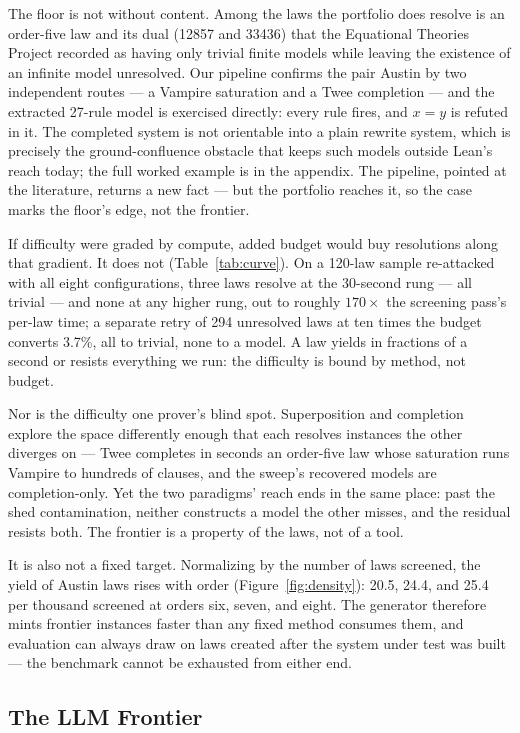 The floor is not without content. Among the laws the portfolio does resolve
is an order-five law and its dual (12857 and 33436) that the Equational
Theories Project recorded as having only trivial finite models while leaving
the existence of an infinite model unresolved. Our pipeline confirms the pair
Austin by two independent routes — a Vampire saturation and a Twee completion
— and the extracted 27-rule model is exercised directly: every rule fires,
and $x = y$ is refuted in it. The completed system is not orientable into a
plain rewrite system, which is precisely the ground-confluence obstacle that
keeps such models outside Lean's reach today; the full worked example is in
the appendix. The pipeline, pointed at the literature, returns a new fact —
but the portfolio reaches it, so the case marks the floor's edge, not the
frontier.

If difficulty were graded by compute, added budget would buy resolutions
along that gradient. It does not (Table~\ref{tab:curve}). On a 120-law
sample re-attacked with all eight configurations, three laws resolve at the
30-second rung — all trivial — and none at any higher rung, out to roughly
$170\times$ the screening pass's per-law time; a separate retry of 294
unresolved laws at ten times the budget converts 3.7\%, all to trivial,
none to a model. A law yields in fractions of a second or resists
everything we run: the difficulty is bound by method, not budget.

Nor is the difficulty one prover's blind spot. Superposition and completion
explore the space differently enough that each resolves instances the other
diverges on — Twee completes in seconds an order-five law whose saturation
runs Vampire to hundreds of clauses, and the sweep's recovered models are
completion-only. Yet the two paradigms' reach ends in the same place: past
the shed contamination, neither constructs a model the other misses, and the
residual resists both. The frontier is a property of the laws, not of a
tool.

It is also not a fixed target. Normalizing by the number of laws screened,
the yield of Austin laws rises with order (Figure~\ref{fig:density}): 20.5,
24.4, and 25.4 per thousand screened at orders six, seven, and eight. The
generator therefore mints frontier instances faster than any fixed method
consumes them, and evaluation can always draw on laws created after the
system under test was built — the benchmark cannot be exhausted from either
end.

\subsection{The LLM Frontier}

